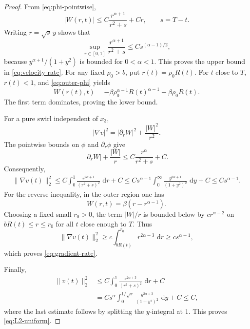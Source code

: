 \documentclass[10pt]{amsart}
\theoremstyle{definition}
\newcommand{\dd}{\,\mathrm d}
\begin{document}
\begin{proof}
From \eqref{eq:phi-pointwise},
\[
    |W(r,t)|\leq C\frac{r^{\alpha+1}}{r^2+s}+Cr,
    \qquad s=T-t.
\]
Writing $r=\sqrt{s}\,y$ shows that
\[
    \sup_{r\in[0,1]}\frac{r^{\alpha+1}}{r^2+s}
    \leq Cs^{(\alpha-1)/2},
\]
because $y^{\alpha+1}/(1+y^2)$ is bounded for $0<\alpha<1$.  This proves the
upper bound in \eqref{eq:velocity-rate}.  For any fixed $\rho_0>b$, put
$r(t)=\rho_0R(t)$.  For $t$ close to $T$, $r(t)<1$, and
\eqref{eq:outer-phi} yields
\[
    W(r(t),t)
    =-\beta\rho_0^{\alpha-1}R(t)^{\alpha-1}
      +\beta\rho_0R(t).
\]
The first term dominates, proving the lower bound.

For a pure swirl independent of $x_3$,
\begin{equation}
\label{eq:grad-swirl}
    |\nabla v|^2=|\partial_rW|^2+\frac{|W|^2}{r^2}.
\end{equation}
The pointwise bounds on $\phi$ and $\partial_r\phi$ give
\[
    |\partial_rW|+\frac{|W|}{r}
    \leq C\frac{r^\alpha}{r^2+s}+C.
\]
Consequently,
\begin{align}
\|\nabla v(t)\|_2^2\leq C\int_0^1\frac{r^{2\alpha+1}}{(r^2+s)^2}\,\dd r+C\leq Cs^{\alpha-1}
      \int_0^\infty\frac{y^{2\alpha+1}}{(1+y^2)^2}\,\dd y+C
     \leq Cs^{\alpha-1}.
\end{align}
For the reverse inequality, in the outer region one has
\[
    W(r,t)=\beta(r-r^{\alpha-1}).
\]
Choosing a fixed small $r_0>0$, the term $|W|/r$ is bounded below by
$cr^{\alpha-2}$ on $bR(t)\leq r\leq r_0$ for all $t$ close enough to $T$.
Thus
\[
    \|\nabla v(t)\|_2^2
    \geq c\int_{bR(t)}^{r_0}r^{2\alpha-3}\,\dd r
    \geq cs^{\alpha-1},
\]
which proves \eqref{eq:gradient-rate}.

Finally,
\begin{align}
    \|v(t)\|_2^2
    &\leq C\int_0^1\frac{r^{2\alpha+3}}{(r^2+s)^2}\,\dd r+C\\
    &=Cs^\alpha\int_0^{1/\sqrt{s}}
       \frac{y^{2\alpha+3}}{(1+y^2)^2}\,\dd y+C
      \leq C,
\end{align}
where the last estimate follows by splitting the $y$-integral at $1$.
This proves \eqref{eq:L2-uniform}.
\end{proof}
\end{document}
